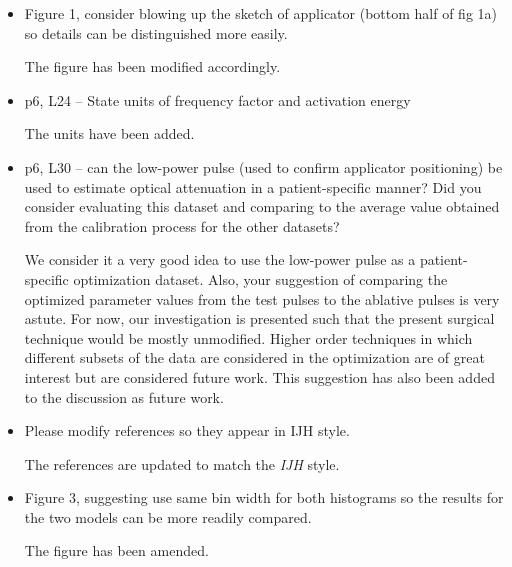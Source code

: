 \documentclass[letterpaper,12pt]{report}
\begin{document}
\begin{itemize}
{}


\item
 Figure 1, consider blowing up the sketch of applicator (bottom half of fig 1a) so details can be distinguished more easily.

{\color{red} The figure has been modified accordingly.  } 

\item
p6, L24 -- State units of frequency factor and activation energy

{\color{red}
The units have been added.
}

\item
p6, L30 -- can the low-power pulse (used to confirm applicator positioning) be used to estimate optical
attenuation in a patient-specific manner? Did you consider evaluating this dataset and comparing to the
average value obtained from the calibration process for the other datasets?

{\color{red}
We consider it a very good idea to use the low-power pulse as a patient-specific optimization dataset. Also,
your suggestion of comparing the optimized parameter values from the test pulses to the ablative pulses is
very astute. For now, 
our investigation is presented such that the present surgical
technique would be mostly unmodified. Higher order techniques in which
different subsets of the data are considered in the optimization are of
great interest but are considered future work. 
This suggestion has also been added to the discussion as future work.

}
\item
Please modify references so they appear in IJH style.

{\color{red}
The references are updated to match the \textit{IJH} style.
}\\
\item
Figure 3, suggesting use same bin width for both histograms so the results for the two models can be
more readily compared.

{\color{red}
The figure has been amended.
}
\end{itemize}
\end{document}

